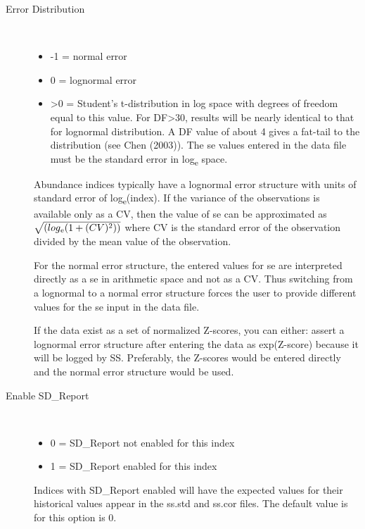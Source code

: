 \begin{description}
	\item[Error Distribution]\
	\begin{itemize}
		\item -1 = normal error
		\item  0 = lognormal error 
		\item >0 = Student's t-distribution in log space with degrees of freedom equal to this value.  For DF>30, results will be nearly identical to that for lognormal distribution.  A DF value of about 4 gives a fat-tail to the distribution (see Chen (2003)).  The se values entered in the data file must be the standard error in log\textsubscript{e} space.
	\end{itemize}

Abundance indices typically have a lognormal error structure with units of standard error of log\textsubscript{e}(index).  If the variance of the observations is available only as a CV, then the value of se can be approximated as $\sqrt{(log\textsubscript{e}(1+(CV)\textsuperscript{2}))}$ where CV is the standard error of the observation divided by the mean value of the observation.

For the normal error structure, the entered values for se are interpreted directly as a se in arithmetic space and not as a CV.  Thus switching from a lognormal to a normal error structure forces the user to provide different values for the se input in the data file.

If the data exist as a set of normalized Z-scores, you can either:  assert a lognormal error structure after entering the data as exp(Z-score) because it will be logged by SS.  Preferably, the Z-scores would be entered directly and the normal error structure would be used.

	\item[Enable SD\_Report]\
	\begin{itemize}
		\item 0 = SD\_Report not enabled for this index
		\item 1 = SD\_Report enabled for this index
	\end{itemize}

Indices with SD\_Report enabled will have the expected values for their historical values appear in the ss.std and ss.cor files. The default value is for this option is 0.

\end{description}

